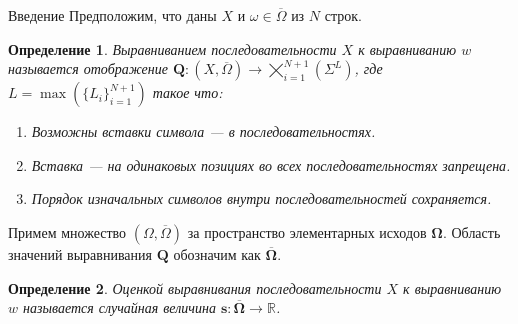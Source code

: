 \documentclass[ucs, notheorems, handout, 10pt]{beamer}
\newtheorem{defenition}{Определение}
\begin{document}
	\begin{frame}{Введение}					
		Предположим, что даны $X$ и $\omega \in \overline{\Omega}$ из $N$ строк. 
		
		\begin{defenition}
			Выравниванием последовательности $X$ к выравниванию $w$ называется отображение $\boldsymbol{Q}: (X, \overline{\Omega}) \rightarrow \bigtimes_{i=1}^{N+1}(\Sigma^{L})$, где $L = \max(\{L_i\}_{i=1}^{N+1})$ такое что:
			\begin{enumerate}
				\item Возможны вставки символа --- в последовательностях.
				\item Вставка --- на одинаковых позициях во всех последовательностях запрещена.
				\item Порядок изначальных символов внутри последовательностей сохраняется.
			\end{enumerate}
		\end{defenition}
		
		Примем множество $(\Omega, \overline \Omega)$ за пространство элементарных исходов $\boldsymbol{\Omega}$. Область значений выравнивания $\boldsymbol Q$ обозначим как $\overline{\boldsymbol{\Omega}}$.
		
		\begin{defenition}				
			Оценкой выравнивания последовательности $X$ к выравниванию $w$ называется случайная величина $\boldsymbol s:\overline{\boldsymbol{\Omega}} \rightarrow \mathbb{R}$.
		\end{defenition}				
		
	\end{frame}
\end{document}
